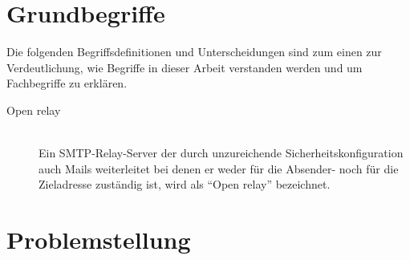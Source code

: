 \documentclass[a4paper,11pt,singlespacing]{article}
\begin{document}
\section{Grundbegriffe}\label{sec:Grundbegriffe}
	Die folgenden Begriffsdefinitionen und Unterscheidungen sind zum einen zur Verdeutlichung, wie Begriffe in dieser Arbeit verstanden werden und um Fachbegriffe zu erklären.
	
	\begin{description}
	\item[Open relay\label{itm:OpenRelay}]\hfill \\
		Ein SMTP-Relay-Server der durch unzureichende Sicherheitskonfiguration auch Mails weiterleitet bei denen er weder für die Absender- noch für die Zieladresse zuständig ist, wird als "`Open relay"' bezeichnet.\cite{SMTP-Relay-Server}
	\end{description}


\section{Problemstellung}\label{sec:Problemstellung}
%	
%	
	

\end{document}
